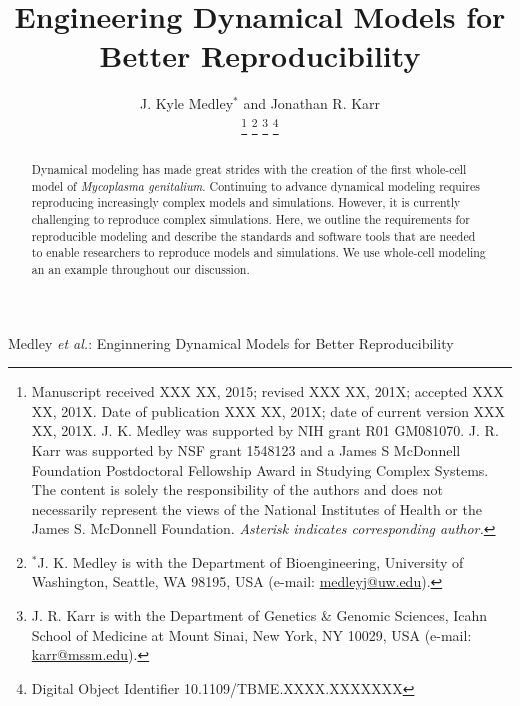 \documentclass[journal,transmag,twoside]{IEEEtran}
\newcommand{\email}[1]{\href{mailto:#1}{#1}}
\begin{document}
\title{Engineering Dynamical Models for Better Reproducibility}

\author{
    J. Kyle Medley$^*$ and
	Jonathan R. Karr
    
    \thanks{
        Manuscript received XXX XX, 2015; revised XXX XX, 201X; accepted XXX XX, 201X. Date of publication XXX XX, 201X; date of current version XXX XX, 201X.
        J. K. Medley was supported by NIH grant R01 GM081070. J. R. Karr was supported by NSF grant 1548123 and a James S McDonnell Foundation Postdoctoral Fellowship Award in Studying Complex Systems. The content is solely the responsibility of the authors and does not necessarily represent the views of the National Institutes of Health or the James S. McDonnell Foundation.
        \textit{Asterisk indicates corresponding author.}
    }
    \thanks{$^*$J. K. Medley is with the Department of Bioengineering, University of Washington, Seattle, WA 98195, USA (e-mail: \email{medleyj@uw.edu}).}
    \thanks{J. R. Karr is with the Department of Genetics \& Genomic Sciences, Icahn School of Medicine at Mount Sinai, New York, NY 10029, USA (e-mail: \email{karr@mssm.edu}).}
    \thanks{Digital Object Identifier 10.1109/TBME.XXXX.XXXXXXX}
}

%
{Medley \MakeLowercase{\textit{et al.}}: Enginnering Dynamical Models for Better Reproducibility}
% 








\maketitle

\begin{abstract}
Dynamical modeling has made great strides with the creation of the first whole-cell model of \textit{Mycoplasma genitalium}.
Continuing to advance dynamical modeling requires reproducing increasingly complex models and simulations. 
However, it is currently challenging to reproduce complex simulations. Here, we outline the requirements for reproducible modeling
and describe the standards and software tools that are needed to enable researchers to reproduce models and simulations. 
We use whole-cell modeling an an example throughout our discussion.
\end{abstract}
\end{document}
